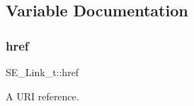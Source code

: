 \subsection{Variable Documentation}
\mbox{\label{group__Link_ga487ebc5f492311a2f580ad81500e6cdf}} 
\subsubsection{\texorpdfstring{href}{href}}
{\footnotesize\ttfamily S\+E\+\_\+\+Link\+\_\+t\+::href}

A U\+RI reference. 